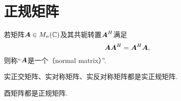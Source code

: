 \section{正规矩阵}
\begin{definition}
若矩阵\(\boldsymbol{A} \in M_n(\mathbb{C})\)及其共轭转置\(\boldsymbol{A}^H\)满足\begin{equation*}
	\boldsymbol{A} \boldsymbol{A}^H = \boldsymbol{A}^H \boldsymbol{A},
\end{equation*}
则称“\(\boldsymbol{A}\)是一个（normal matrix）”.
\end{definition}

\begin{property}
实正交矩阵、实对称矩阵、实反对称矩阵都是实正规矩阵.
\end{property}

\begin{property}
酉矩阵都是正规矩阵.
\end{property}
